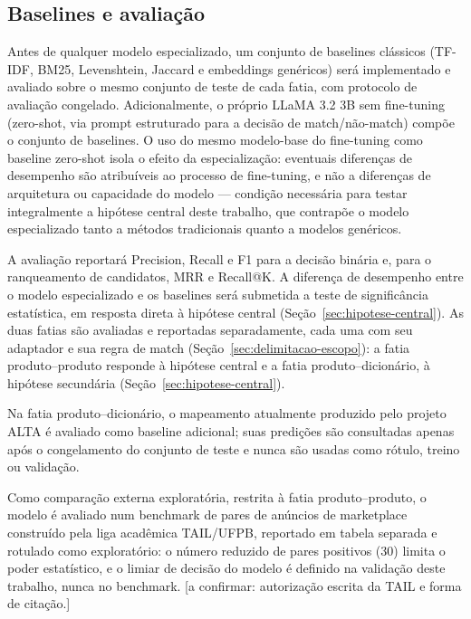 \documentclass[
    article,
    12pt,
    oneside,
    a4paper,
    english,
    brazilian
    ]{abntex2}
\numberwithin{equation}{section}
\begin{document}


\subsection{Baselines e avaliação}
\label{sec:baselines-avaliacao}

Antes de qualquer modelo especializado, um conjunto de baselines clássicos (TF-IDF, BM25, Levenshtein, Jaccard e embeddings genéricos) será implementado e avaliado sobre o mesmo conjunto de teste de cada fatia, com protocolo de avaliação congelado. Adicionalmente, o próprio LLaMA 3.2 3B sem fine-tuning (zero-shot, via prompt estruturado para a decisão de match/não-match) compõe o conjunto de baselines. O uso do mesmo modelo-base do fine-tuning como baseline zero-shot isola o efeito da especialização: eventuais diferenças de desempenho são atribuíveis ao processo de fine-tuning, e não a diferenças de arquitetura ou capacidade do modelo --- condição necessária para testar integralmente a hipótese central deste trabalho, que contrapõe o modelo especializado tanto a métodos tradicionais quanto a modelos genéricos.

A avaliação reportará Precision, Recall e F1 para a decisão binária e, para o ranqueamento de candidatos, MRR e Recall@K. A diferença de desempenho entre o modelo especializado e os baselines será submetida a teste de significância estatística, em resposta direta à hipótese central (Seção~\ref{sec:hipotese-central}). As duas fatias são avaliadas e reportadas separadamente, cada uma com seu adaptador e sua regra de match (Seção~\ref{sec:delimitacao-escopo}): a fatia produto--produto responde à hipótese central e a fatia produto--dicionário, à hipótese secundária (Seção~\ref{sec:hipotese-central}).

Na fatia produto--dicionário, o mapeamento atualmente produzido pelo projeto ALTA é avaliado como baseline adicional; suas predições são consultadas apenas após o congelamento do conjunto de teste e nunca são usadas como rótulo, treino ou validação.

Como comparação externa exploratória, restrita à fatia produto--produto, o modelo é avaliado num benchmark de pares de anúncios de marketplace construído pela liga acadêmica TAIL/UFPB, reportado em tabela separada e rotulado como exploratório: o número reduzido de pares positivos (30) limita o poder estatístico, e o limiar de decisão do modelo é definido na validação deste trabalho, nunca no benchmark. [a confirmar: autorização escrita da TAIL e forma de citação.]
\end{document}
